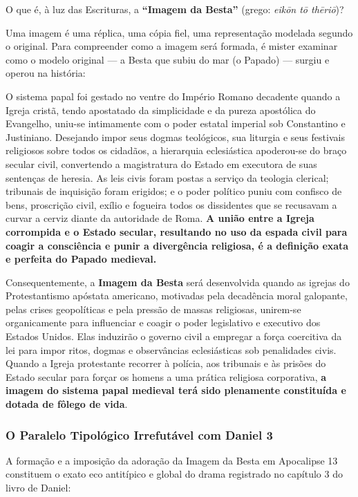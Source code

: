 O que é, à luz das Escrituras, a \textbf{``Imagem da Besta''} (grego: \textit{eikōn tō thēriō})?

Uma imagem é uma réplica, uma cópia fiel, uma representação modelada segundo o original. Para compreender como a imagem será formada, é mister examinar como o modelo original — a Besta que subiu do mar (o Papado) — surgiu e operou na história:

O sistema papal foi gestado no ventre do Império Romano decadente quando a Igreja cristã, tendo apostatado da simplicidade e da pureza apostólica do Evangelho, uniu-se intimamente com o poder estatal imperial sob Constantino e Justiniano. Desejando impor seus dogmas teológicos, sua liturgia e seus festivais religiosos sobre todos os cidadãos, a hierarquia eclesiástica apoderou-se do braço secular civil, convertendo a magistratura do Estado em executora de suas sentenças de heresia. As leis civis foram postas a serviço da teologia clerical; tribunais de inquisição foram erigidos; e o poder político puniu com confisco de bens, proscrição civil, exílio e fogueira todos os dissidentes que se recusavam a curvar a cerviz diante da autoridade de Roma. \textbf{A união entre a Igreja corrompida e o Estado secular, resultando no uso da espada civil para coagir a consciência e punir a divergência religiosa, é a definição exata e perfeita do Papado medieval.}

Consequentemente, a \textbf{Imagem da Besta} será desenvolvida quando as igrejas do Protestantismo apóstata americano, motivadas pela decadência moral galopante, pelas crises geopolíticas e pela pressão de massas religiosas, unirem-se organicamente para influenciar e coagir o poder legislativo e executivo dos Estados Unidos. Elas induzirão o governo civil a empregar a força coercitiva da lei para impor ritos, dogmas e observâncias eclesiásticas sob penalidades civis. Quando a Igreja protestante recorrer à polícia, aos tribunais e às prisões do Estado secular para forçar os homens a uma prática religiosa corporativa, \textbf{a imagem do sistema papal medieval terá sido plenamente constituída e dotada de fôlego de vida}.


\subsubsection*{O Paralelo Tipológico Irrefutável com Daniel 3}


A formação e a imposição da adoração da Imagem da Besta em Apocalipse 13 constituem o exato eco antitípico e global do drama registrado no capítulo 3 do livro de Daniel:


